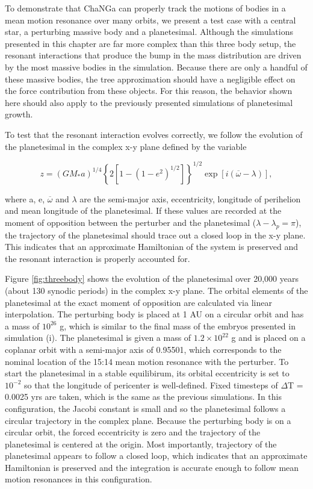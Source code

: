 To demonstrate that {\sc ChaNGa} can properly track the motions of bodies in a mean motion resonance over many orbits, we 
present a test case with a central star, a perturbing massive body and a planetesimal. Although the simulations presented in this 
chapter are far more complex than this three body setup, the resonant interactions that produce the bump in the mass distribution 
are driven by the most massive bodies in the simulation. Because there are only a handful of these massive bodies, the tree 
approximation should have a negligible effect on the force contribution from these objects. For this reason, the behavior shown 
here should also apply to the previously presented simulations of planetesimal growth.

To test that the resonant interaction evolves correctly, we follow the evolution of the planetesimal in the complex x-y plane 
defined by the variable \cite{duncan89}

\begin{equation}\label{eq:complex}
    z = \left(G M_{*} a\right)^{1 / 4}\left\{2\left[1-\left(1-e^{2}\right)^{1 / 2}\right]\right\}^{1 / 2} \exp \left[i(\overline{\omega}-\lambda)\right],
\end{equation}

\noindent where a, e, $\overline{\omega}$ and $\lambda$ are the semi-major axis, eccentricity, longitude of perihelion and mean 
longitude of the planetesimal. If these values are recorded at the moment of opposition between the perturber and the 
planetesimal ($\lambda - \lambda_{p} = \pi$), the trajectory of the planetesimal should trace out a closed loop in the x-y plane. 
This indicates that an approximate Hamiltonian of the system is preserved and the resonant interaction is properly accounted for.

Figure \ref{fig:threebody} shows the evolution of the planetesimal over 20,000 years (about 130 synodic periods) in the complex 
x-y plane. The orbital elements of the planetesimal at the exact moment of opposition are calculated via linear interpolation. The 
perturbing body is placed at 1 AU on a circular orbit and has a mass of $10^{26}$ g, which is similar to the final mass of the 
embryos presented in simulation (i). The planetesimal is given a mass of $1.2 \times 10^{22}$ g and is placed on a coplanar 
orbit with a semi-major axis of 0.95501, which corresponds to the nominal location of the 15:14 mean motion resonance with the 
perturber. To start the planetesimal in a stable equilibirum, its orbital eccentricity is set to $10^{-2}$ so that the longitude of 
pericenter is well-defined. Fixed timesteps of $\Delta$T = 0.0025 yrs are taken, which is the same as the previous simulations. In 
this configuration, the Jacobi constant is small and so the planetesimal follows a circular trajectory in the complex plane. 
Because the perturbing body is on a circular orbit, the forced eccentricity is zero and the trajectory of the planetesimal is 
centered at the origin. Most importantly, trajectory of the planetesimal appears to follow a closed loop, which indicates that an 
approximate Hamiltonian is preserved and the integration is accurate enough to follow mean motion resonances in this 
configuration.

